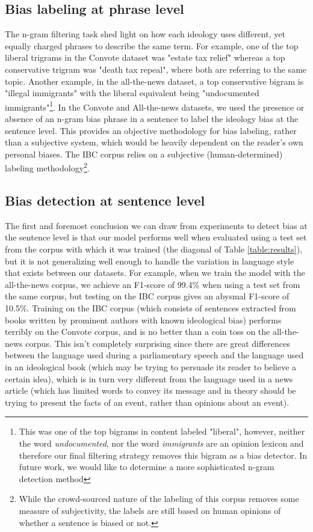 \documentclass[10pt,a4paper,onecolumn]{article}
\begin{document}
\subsection{Bias labeling at phrase level}
The n-gram filtering task shed light on how each ideology uses different, yet equally charged phrases to describe the same term. For example, one of the top liberal trigrams in the Convote dataset was "estate tax relief" whereas a top conservative trigram was "death tax repeal", where both are referring to the same topic. Another example, in the all-the-news dataset, a top conservative bigram is "illegal immigrants" with the liberal equivalent being "undocumented immigrants"\footnote{This was one of the top bigrams in content labeled "liberal", however, neither the word \textit{undocumented}, nor the word \textit{immigrants} are an opinion lexicon and therefore our final filtering strategy removes this bigram as a bias detector. In future work, we would like to determine a more sophisticated n-gram detection method}. In the Convote and All-the-news datasets, we used the presence or absence of an n-gram bias phrase in a sentence to label the ideology bias at the sentence level. This provides an objective methodology for bias labeling, rather than a subjective system, which would be heavily dependent on the reader's own personal biases. The IBC corpus relies on a subjective (human-determined) labeling methodology\footnote{While the crowd-sourced nature of the labeling of this corpus removes some measure of subjectivity, the labels are still based on human opinions of whether a sentence is biased or not.}. 

\subsection{Bias detection at sentence level} 
The first and foremost conclusion we can draw from experiments to detect bias at the sentence level is that our model performs well when evaluated using a test set from the corpus with which it was trained (the diagonal of Table \ref{table:results}), but it is not generalizing well enough to handle the variation in language style that exists between our datasets. For example, when we train the model with the all-the-news corpus, we achieve an F1-score of 99.4\% when using a test set from the same corpus, but testing on the IBC corpus gives an abysmal F1-score of 10.5\%. Training on the IBC corpus (which consists of sentences extracted from books written by prominent authors with known ideological bias) performs terribly on the Convote corpus, and is no better than a coin toss on the all-the-news corpus. This isn't completely surprising since there are great differences between the language used during a parliamentary speech and the language used in an ideological book (which may be trying to persuade its reader to believe a certain idea), which is in turn very different from the language used in a news article (which has limited words to convey its message and in theory should be trying to present the facts of an event, rather than opinions about an event).
\end{document}
